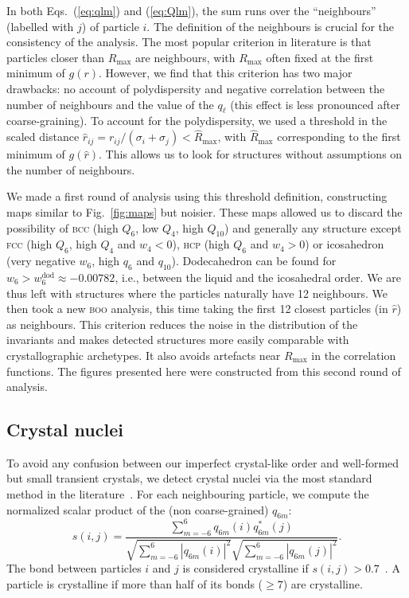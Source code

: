 In both Eqs.~(\ref{eq:qlm}) and (\ref{eq:Qlm}), the sum runs over the ``neighbours'' (labelled with $j$) of particle $i$. The definition of the neighbours is crucial for the consistency of the analysis. The most popular criterion in literature is that particles closer than $R_\text{max}$ are neighbours, with $R_\text{max}$ often fixed at the first minimum of $g(r)$. However, we find that this criterion has two major drawbacks: no account of polydispersity and negative correlation between the number of neighbours and the value of the $q_\ell$ (this effect is less pronounced after coarse-graining). To account for the polydispersity, we used a threshold in the scaled distance $\hat{r}_{i j} = r_{i j} /(\sigma_i+\sigma_j) < \hat{R}_\text{max}$, with $\hat{R}_\text{max}$ corresponding to the first minimum of $g(\hat{r})$. This allows us to look for structures without assumptions on the number of neighbours. 

We made a first round of analysis using this threshold definition, constructing maps similar to Fig.~\ref{fig:maps} but noisier. These maps allowed us to discard the possibility of \textsc{bcc} (high $Q_6$, low $Q_4$, high $Q_{10}$) and generally any structure except \textsc{fcc} (high $Q_6$, high $Q_4$ and $w_4<0$), \textsc{hcp} (high $Q_6$ and $w_4>0$) or icosahedron (very negative $w_6$, high $q_6$ and $q_{10}$). Dodecahedron can be found for $w_6>w_6^\text{dod}\approx -0.00782$, i.e., between the liquid and the icosahedral order. We are thus left with structures where the particles naturally have 12 neighbours. We then took a new \textsc{boo} analysis, this time taking the first 12 closest particles (in $\hat{r}$) as neighbours. This criterion reduces the noise in the distribution of the invariants and makes detected structures more easily comparable with crystallographic archetypes. It also avoids artefacts near $R_\text{max}$ in the correlation functions. The figures presented here were constructed from this second round of analysis.

\subsection*{Crystal nuclei}

To avoid any confusion between our imperfect crystal-like order and well-formed but small transient crystals, we detect crystal nuclei via the most standard method in the literature~\cite{ReintenWolde1996, Zaccarelli2009}. For each neighbouring particle, we compute the normalized scalar product of the (non coarse-grained) $q_{6 m}$:
\begin{equation}
	s(i,j) = \frac{
		\sum_{m=-6}^{6} q_{6 m}(i) q_{6 m}^{*}(j)
	}{
		\sqrt{\sum_{m=-6}^{6} |q_{6 m}(i)|^2} \sqrt{\sum_{m=-6}^{6} |q_{6 m}(j)|^2}
	}.
	\label{eq:boo_dot_product}
\end{equation}
The bond between particles $i$ and $j$ is considered crystalline if $s(i,j)>0.7$~\cite{Zaccarelli2009}. A particle is crystalline if more than half of its bonds ($\geq 7$) are crystalline.

